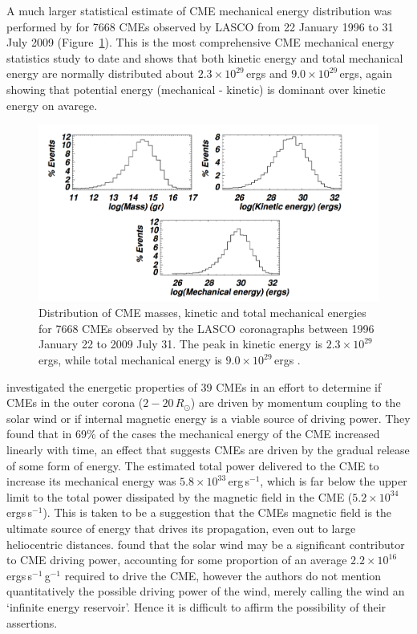 A much larger statistical estimate of CME mechanical energy distribution was performed by \citet{vour2010} for 7668 CMEs observed by LASCO from 22 January 1996 to 31 July 2009 (Figure~\ref{fig:energy_dist}). This is the most comprehensive CME mechanical energy statistics study to date and shows that both kinetic energy and total mechanical energy are normally distributed about $2.3\times10^{29}$\,ergs and $9.0\times10^{29}$\,ergs, again showing that potential energy (mechanical - kinetic) is dominant over kinetic energy on avarege.
\begin{figure}[t!]
\begin{center}
\includegraphics[trim = 1cm 0cm 0cm 3cm, scale=0.3]{images/energy_dist}
\caption[Distribution of CME masses, kinetic and total mechanical energies]{Distribution of CME masses, kinetic and total mechanical energies for 7668 CMEs observed by the LASCO
coronagraphs between 1996 January 22 to 2009 July 31. The peak in kinetic energy is $2.3\times10^{29}$\,ergs, while total mechanical energy is $9.0\times10^{29}$\,ergs \citep{vour2010}.}
\label{fig:energy_dist}
\end{center}
\end{figure}

\citet{subram2007} investigated the energetic properties of 39 CMEs in an effort to determine if CMEs in the outer corona ($2-20\,R_{\odot}$) are driven by momentum coupling to the solar wind or if internal magnetic energy is a viable source of driving power. They found that in 69\% of the cases the mechanical energy of the CME increased linearly with time, an effect that suggests CMEs are driven by the gradual release of some form of energy. The estimated total power delivered to the CME to increase its mechanical energy was $5.8\times10^{33}$\,erg\,s$^{-1}$, which is far below the upper limit to the total power dissipated by the magnetic field in the CME ($5.2\times10^{34}$\,ergs\,s$^{-1}$). This is taken to be a suggestion that the CMEs magnetic field is the ultimate source of energy that drives its propagation, even out to large heliocentric distances. \citet{lewis2002} found that the solar wind may be a significant contributor to CME driving power, accounting for some proportion of an average $2.2\times10^{16}$\,ergs\,s$^{-1}$\,g$^{-1}$ required to drive the CME, however the authors do not mention quantitatively the possible driving power of the wind, merely calling the wind an \textquoteleft infinite energy reservoir'. Hence it is difficult to affirm the possibility of their assertions.


